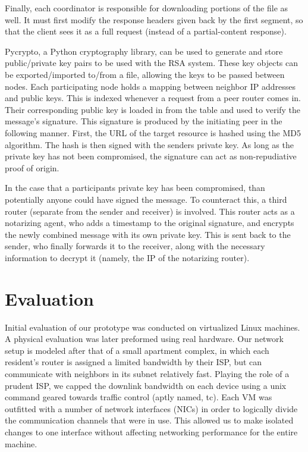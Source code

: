 \documentclass[12pt]{article}
\begin{document}
			Finally, each coordinator is responsible for downloading portions of the file as well. It must first modify the response headers given back by the first segment, so that the client sees it as a full request (instead of a partial-content response).

			Pycrypto, a Python cryptography library, can be used to generate and store public/private key pairs to be used with the RSA system. These key objects can be exported/imported to/from a file, allowing the keys to be passed between nodes. Each participating node holds a mapping between neighbor IP addresses and public keys. This is indexed whenever a request from a peer router comes in. Their corresponding public key is loaded in from the table and used to verify the message's signature. This signature is produced by the initiating peer in the following manner. First, the URL of the target resource is hashed using the MD5 algorithm. The hash is then signed with the senders private key. As long as the private key has not been compromised, the signature can act as non-repudiative proof of origin.

			In the case that a participants private key has been compromised, than potentially anyone could have signed the message. To counteract this, a third router (separate from the sender and receiver) is involved. This router acts as a notarizing agent, who adds a timestamp to the original signature, and encrypts the newly combined message with its own private key. This is sent back to the sender, who finally forwards it to the receiver, along with the necessary information to decrypt it (namely, the IP of the notarizing router).




\newpage
\section{Evaluation}

	Initial evaluation of our prototype was conducted on virtualized Linux machines. A physical evaluation was later preformed using real hardware. Our network setup is modeled after that of a small apartment complex, in which each resident's router is assigned a limited bandwidth by their ISP, but can communicate with neighbors in its subnet relatively fast. Playing the role of a prudent ISP, we capped the downlink bandwidth on each device using a unix command geared towards traffic control (aptly named, tc). Each VM was outfitted with a number of network interfaces (NICs) in order to logically divide the communication channels that were in use. This allowed us to make isolated changes to one interface without affecting networking performance for the entire machine. 
\end{document}
